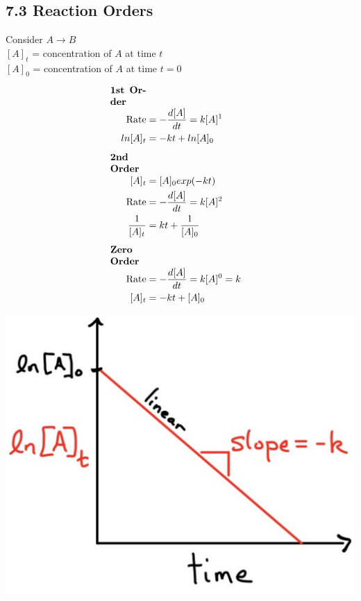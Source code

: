 \subsection{7.3 Reaction Orders}
\vspace*{0.5em}
Consider $A \longrightarrow B$\\
$[A]_t$ = concentration of $A$ at time $t$\\
$[A]_0$ = concentration of $A$ at time $t=0$
\vspace*{0.5em}

\begin{minipage}{0.99\linewidth}
    \begin{minipage}{0.65\linewidth}
        \begin{align*}
            \parbox{1.3cm}{\textbf{1st Order}}\\
            \text{Rate} &= -\frac{d[A]}{d t} = k[A]^1 \\
            ln[A]_t &= -k t + ln[A]_0
            \\[0.5em]
            \parbox{1.3cm}{\textbf{2nd Order}}\\
            [A]_t& = [A]_0 exp(-k t)\\
            \text{Rate} &= -\frac{d[A]}{d t} = k[A]^2 \\
            \frac{1}{[A]_t} &= k t + \frac{1}{[A]_0}
            \\[0.5em]
            \parbox{1.3cm}{\textbf{Zero Order}}\\
            \text{Rate} &= -\frac{d[A]}{d t} = k[A]^0 = k \\
            [A]_t &= -k t + [A]_0 \\
        \end{align*}
    \end{minipage}
    \begin{minipage}{0.34\linewidth}
        \includegraphics[width=0.9\linewidth]{src/7_Kinetics/images/1st_order.pdf}


\end{minipage}
\end{minipage}
